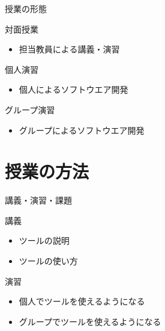 \documentclass[t, aspectratio=169]{beamer}
\begin{document}
\begin{frame}[label=sec-1-2-3]{授業の形態}
\begin{block}{対面授業}
\begin{itemize}
\item 担当教員による講義・演習
\end{itemize}
\end{block}

\begin{block}{個人演習}
\begin{itemize}
\item 個人によるソフトウエア開発
\end{itemize}
\end{block}

\begin{block}{グループ演習}
\begin{itemize}
\item グループによるソフトウエア開発
\end{itemize}
\end{block}
\end{frame}

\section{授業の方法}
\label{sec-1-3}
\begin{frame}[label=sec-1-3-1]{講義・演習・課題}
\begin{block}{講義}
\begin{itemize}
\item ツールの説明
\item ツールの使い方
\end{itemize}
\end{block}

\begin{block}{演習}
\begin{itemize}
\item 個人でツールを使えるようになる
\item グループでツールを使えるようになる
\end{itemize}
\end{block}
\end{frame}
\end{document}
